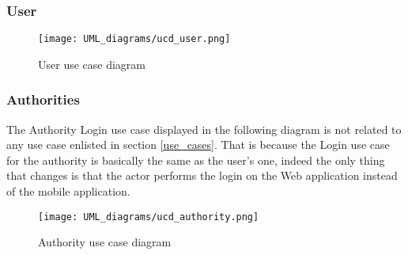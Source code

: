\subsubsection{User}
\begin{figure}[H]
  \centering
  \texttt{[image: UML\_diagrams/ucd\_user.png]}
  \caption{User use case diagram}
  \label{fig:user_ucd}
\end{figure}

\subsubsection{Authorities}
The Authority Login use case displayed in the following diagram is not related to any use case enlisted in section \ref{use_cases}. That is because the Login use case for the authority is basically the same as the user's one, indeed the only thing that changes is that the actor performs the login on the Web application instead of the mobile application.

\begin{figure}[H]
  \centering
  \texttt{[image: UML\_diagrams/ucd\_authority.png]}
  \caption{Authority use case diagram}
  \label{fig:authority_ucd}
\end{figure}
